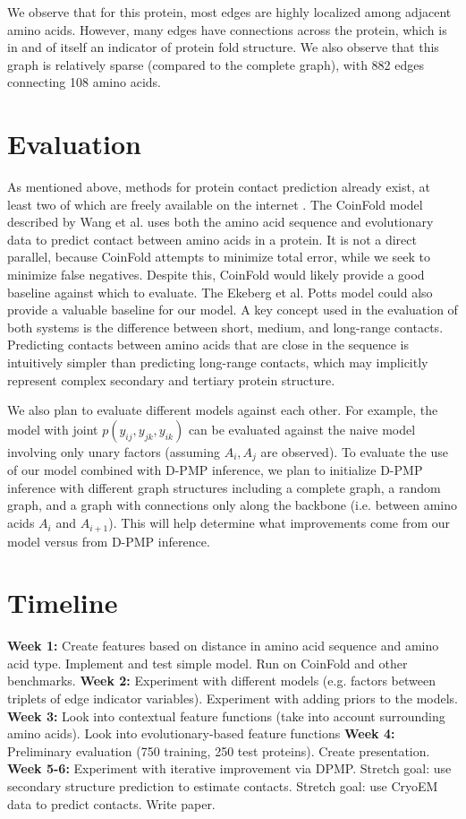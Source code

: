 \documentclass{article}
\begin{document}
We observe that for this protein, most edges are highly localized among adjacent amino acids. However, many edges have connections across the protein, which is in and of itself an indicator of protein fold structure. We also observe that this graph is relatively sparse (compared to the complete graph), with 882 edges connecting 108 amino acids. 


\section{Evaluation}
As mentioned above, methods for protein contact prediction already exist, at least two of which are freely available on the internet\cite{ekeberg13} \cite{wang16}. The CoinFold model described by Wang et al. uses both the amino acid sequence and evolutionary data to predict contact between amino acids in a protein. It is not a direct parallel, because CoinFold attempts to minimize total error, while we seek to minimize false negatives. Despite this, CoinFold would likely provide a good baseline against which to evaluate. The Ekeberg et al. \cite{ekeberg13} Potts model could also provide a valuable baseline for our model. A key concept used in the evaluation of both systems is the difference between short, medium, and long-range contacts. Predicting contacts between amino acids that are close in the sequence is intuitively simpler than predicting long-range contacts, which may implicitly represent complex secondary and tertiary protein structure. 

We also plan to evaluate different models against each other. For example, the model with joint $p(y_{ij}, y_{jk}, y_{ik})$ can be evaluated against the naive model involving only unary factors (assuming $A_i, A_j$ are observed). To evaluate the use of our model combined with D-PMP inference, we plan to initialize D-PMP inference with different graph structures including a complete graph, a random graph, and a graph with connections only along the backbone (i.e. between amino acids $A_i$ and $A_{i+1}$). This will help determine what improvements come from our model versus from D-PMP inference. 

\section{Timeline}
\textbf{Week 1:} Create features based on distance in amino acid sequence and amino acid type. Implement and test simple model. Run on CoinFold and other benchmarks.
\textbf{Week 2:} Experiment with different models (e.g. factors between triplets of edge indicator variables). Experiment with adding priors to the models.
\textbf{Week 3:} Look into contextual feature functions (take into account surrounding amino acids). Look into evolutionary-based feature functions
\textbf{Week 4:} Preliminary evaluation (750 training, 250 test proteins). Create presentation.
\textbf{Week 5-6:} Experiment with iterative improvement via DPMP. Stretch goal: use secondary structure prediction to estimate contacts. Stretch goal: use CryoEM data to predict contacts. Write paper.
\end{document}
